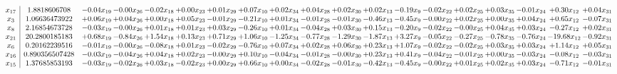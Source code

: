 \documentclass[9pt]{article}
\begin{document}
 \[\begin{array}{c| c c@{\hskip 2pt} c@{\hskip 2pt} c@{\hskip 2pt} c@{\hskip 2pt} c@{\hskip 2pt} c@{\hskip 2pt} c@{\hskip 2pt} c@{\hskip 2pt} c@{\hskip 2pt} c@{\hskip 2pt} c@{\hskip 2pt} c@{\hskip 2pt} c@{\hskip 2pt} c@{\hskip 2pt} c@{\hskip 2pt} c@{\hskip 2pt} c@{\hskip 2pt} }
 x_{17}   &  1.8818606708 & -0.04 x_{19} & -0.00 x_{26} & -0.02 x_{18} & +  0.00 x_{23} & +  0.01 x_{29} & +  0.07 x_{10} & +  0.02 x_{34} & +  0.04 x_{28} & +  0.02 x_{30} & +  0.02 x_{13} & -0.19 x_{9} & -0.02 x_{22} & +  0.02 x_{25} & +  0.03 x_{35} & -0.01 x_{24} & +  0.30 x_{12} & +  0.04 x_{31}\\
 x_{3}   &  1.06636473922 & +  0.06 x_{19} & +  0.04 x_{26} & +  0.00 x_{18} & +  0.05 x_{23} & -0.01 x_{29} & -0.21 x_{10} & +  0.01 x_{34} & -0.01 x_{28} & -0.01 x_{30} & -0.46 x_{13} & -0.45 x_{9} & -0.00 x_{22} & +  0.02 x_{25} & +  0.00 x_{35} & +  0.04 x_{24} & +  0.65 x_{12} & -0.07 x_{31}\\
 x_{8}   &  2.16854673728 & -0.03 x_{19} & -0.00 x_{26} & +  0.01 x_{18} & +  0.01 x_{23} & +  0.03 x_{29} & -0.26 x_{10} & +  0.01 x_{34} & -0.04 x_{28} & +  0.03 x_{30} & +  0.15 x_{13} & -0.20 x_{9} & -0.02 x_{22} & -0.00 x_{25} & +  0.04 x_{35} & +  0.03 x_{24} & -0.27 x_{12} & +  0.02 x_{31}\\
 x_{21}   &  20.2800185183 & +  0.68 x_{19} & -0.84 x_{26} & +  1.54 x_{18} & +  0.13 x_{23} & +  0.71 x_{29} & +  1.06 x_{10} & -1.25 x_{34} & -0.77 x_{28} & -1.29 x_{30} & -1.87 x_{13} & +  3.27 x_{9} & -0.05 x_{22} & -0.27 x_{25} & -0.78 x_{35} & -0.76 x_{24} & -19.68 x_{12} & -0.92 x_{31}\\
 x_{6}   &  0.20162239516 & -0.01 x_{19} & -0.00 x_{26} & -0.08 x_{18} & +  0.01 x_{23} & -0.02 x_{29} & -0.76 x_{10} & +  0.07 x_{34} & +  0.02 x_{28} & +  0.06 x_{30} & +  0.23 x_{13} & +  1.07 x_{9} & -0.02 x_{22} & -0.02 x_{25} & +  0.03 x_{35} & +  0.03 x_{24} & +  1.14 x_{12} & +  0.05 x_{31}\\
 x_{16}   &  0.890356507428 & -0.03 x_{19} & -0.04 x_{26} & +  0.04 x_{18} & +  0.02 x_{23} & -0.00 x_{29} & +  0.10 x_{10} & -0.04 x_{34} & -0.01 x_{28} & -0.00 x_{30} & +  0.23 x_{13} & +  0.41 x_{9} & -0.04 x_{22} & -0.01 x_{25} & +  0.00 x_{35} & -0.03 x_{24} & -0.08 x_{12} & -0.03 x_{31}\\
 x_{15}   &  1.37685853193 & -0.03 x_{19} & -0.02 x_{26} & +  0.03 x_{18} & -0.02 x_{23} & +  0.00 x_{29} & +  0.66 x_{10} & +  0.00 x_{34} & -0.02 x_{28} & -0.01 x_{30} & -0.42 x_{13} & -0.45 x_{9} & -0.00 x_{22} & +  0.01 x_{25} & +  0.02 x_{35} & +  0.03 x_{24} & -0.71 x_{12} & -0.01 x_{31}\\

\end{array}\]
\end{document}
